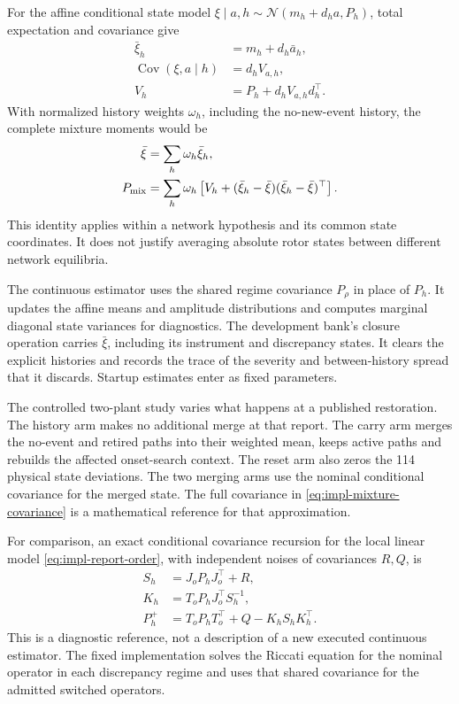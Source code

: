 For the affine conditional state model
$\xi\mid a,h\sim\mathcal N(m_h+d_ha,P_h)$, total expectation and
covariance give
\begin{align}
 \bar\xi_h&=m_h+d_h\bar a_h,\nonumber\\
 \operatorname{Cov}(\xi,a\mid h)&=d_hV_{a,h},\nonumber\\
 V_h&=P_h+d_hV_{a,h}d_h^\top.
 \label{eq:impl-state-amplitude-moments}
\end{align}
With normalized history weights $\omega_h$, including the no-new-event
history, the complete mixture moments would be
\begin{align}
 \bar\xi&=\sum_h\omega_h\bar\xi_h,\nonumber\\
 P_{\rm mix}&=\sum_h\omega_h
       \left[V_h+(\bar\xi_h-\bar\xi)(\bar\xi_h-\bar\xi)^\top\right].
 \label{eq:impl-mixture-covariance}
\end{align}
This identity applies within a network hypothesis and its common state
coordinates. It does not justify averaging absolute rotor states between
different network equilibria.

The continuous estimator uses the shared regime covariance $P_\rho$ in
place of $P_h$. It updates the affine means and amplitude distributions
and computes marginal diagonal state variances for diagnostics. The
development bank's closure operation carries $\bar\xi$, including its
instrument and discrepancy states. It clears the explicit histories and
records the trace of the severity and between-history spread that it
discards. Startup estimates enter as fixed parameters.

The controlled two-plant study varies what happens at a published
restoration. The history arm makes no additional merge at that report.
The carry arm merges the no-event and retired paths into their weighted
mean, keeps active paths and rebuilds the affected onset-search context.
The reset arm also zeros the 114 physical state deviations. The two
merging arms use the nominal conditional covariance for the merged state.
The full covariance in \eqref{eq:impl-mixture-covariance} is a
mathematical reference for that approximation.

For comparison, an exact conditional covariance recursion for the local
linear model \eqref{eq:impl-report-order}, with independent noises of
covariances $R,Q$, is
\begin{align}
 S_h&=J_oP_hJ_o^\top+R,\nonumber\\
 K_h&=T_oP_hJ_o^\top S_h^{-1},\nonumber\\
 P_h^+&=T_oP_hT_o^\top+Q-K_hS_hK_h^\top.
 \label{eq:impl-reference-riccati}
\end{align}
This is a diagnostic reference, not a description of a new executed
continuous estimator. The fixed implementation solves the Riccati
equation for the nominal operator in each discrepancy regime and uses
that shared covariance for the admitted switched operators.

